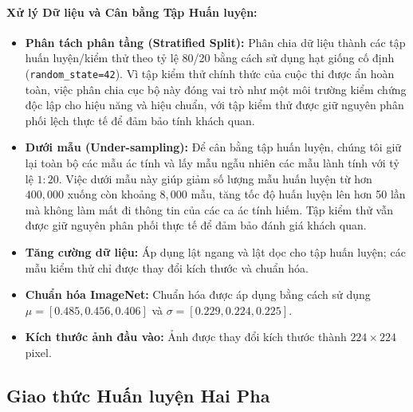 \documentclass[11pt, a4paper]{article}
\begin{document}
\paragraph{Xử lý Dữ liệu và Cân bằng Tập Huấn luyện:}
\begin{itemize}
    \item \textbf{Phân tách phân tầng (Stratified Split):} Phân chia dữ liệu thành các tập huấn luyện/kiểm thử theo tỷ lệ 80/20 bằng cách sử dụng hạt giống cố định (\texttt{random\_state=42}). Vì tập kiểm thử chính thức của cuộc thi được ẩn hoàn toàn, việc phân chia cục bộ này đóng vai trò như một môi trường kiểm chứng độc lập cho hiệu năng và hiệu chuẩn, với tập kiểm thử được giữ nguyên phân phối lệch thực tế để đảm bảo tính khách quan.
    \item \textbf{Dưới mẫu (Under-sampling):} Để cân bằng tập huấn luyện, chúng tôi giữ lại toàn bộ các mẫu ác tính và lấy mẫu ngẫu nhiên các mẫu lành tính với tỷ lệ $1:20$. Việc dưới mẫu này giúp giảm số lượng mẫu huấn luyện từ hơn $400,000$ xuống còn khoảng $8,000$ mẫu, tăng tốc độ huấn luyện lên hơn 50 lần mà không làm mất đi thông tin của các ca ác tính hiếm. Tập kiểm thử vẫn được giữ nguyên phân phối thực tế để đảm bảo đánh giá khách quan.
    \item \textbf{Tăng cường dữ liệu:} Áp dụng lật ngang và lật dọc cho tập huấn luyện; các mẫu kiểm thử chỉ được thay đổi kích thước và chuẩn hóa.
    \item \textbf{Chuẩn hóa ImageNet:} Chuẩn hóa được áp dụng bằng cách sử dụng $\mu = [0.485, 0.456, 0.406]$ và $\sigma = [0.229, 0.224, 0.225]$.
    \item \textbf{Kích thước ảnh đầu vào:} Ảnh được thay đổi kích thước thành $224 \times 224$ pixel.
\end{itemize}


\subsection{Giao thức Huấn luyện Hai Pha}\label{subsec:two_phase}
\end{document}
